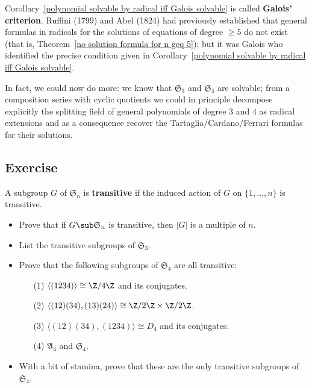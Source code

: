 Corollary~\ref{polynomial solvable by radical iff Galois solvable} is called \textbf{Galois' criterion}. Ruffini (1799) and Abel (1824) had previously established that general formulas in radicals for the solutions of equations of degree $\geq 5$ do not exist (that is, Theorem~\ref{no solution formula for n geq 5}); but it was Galois who identified the precise condition given in Corollary~\ref{polynomial solvable by radical iff Galois solvable}.\par
In fact, we could now do more: we know that $\mathfrak{S}_3$ and $\mathfrak{S}_4$ are solvable; from a composition series with cyclic quotients we could in principle decompose explicitly the splitting field of general polynomials of degree $3$ and $4$ as radical extensions and as a consequence recover the Tartaglia/Cardano/Ferrari formulas for their solutions.
\subsection{Exercise}
\begin{exercise}
A subgroup $G$ of $\mathfrak{S}_n$ is \textbf{transitive} if the induced action of $G$ on $\{1,\dots,n\}$
is transitive.
\begin{itemize}
\item Prove that if $G\sub\mathfrak{S}_n$ is transitive, then $|G|$ is a multiple of $n$.
\item List the transitive subgroups of $\mathfrak{S}_3$.
\item Prove that the following subgroups of $\mathfrak{S}_4$ are all transitive:
\begin{itemize}
\item[(1)]$\langle(1234)\rangle\cong\Z/4\Z$ and its conjugates.
\item[(2)]$\langle(12)(34),(13)(24)\rangle\cong\Z/2\Z\times\Z/2\Z$.
\item[(3)]$\langle(12)(34),(1234)\rangle\cong D_4$ and its conjugates.
\item[(4)]$\mathfrak{A}_4$ and $\mathfrak{S}_4$.
\end{itemize}
\item With a bit of stamina, prove that these are the only transitive subgroups of $\mathfrak{S}_4$.
\end{itemize}
\end{exercise}
